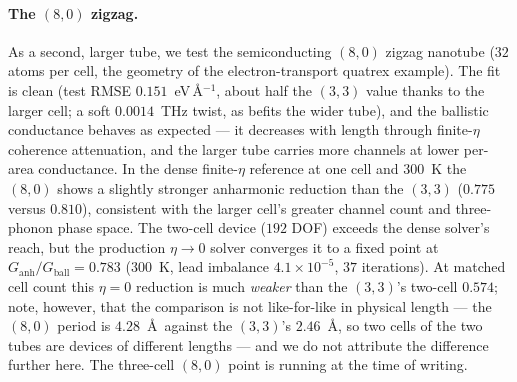 \paragraph{The $(8,0)$ zigzag.} As a second, larger tube, we test
the semiconducting $(8,0)$ zigzag nanotube ($32$ atoms per cell,
the geometry of the electron-transport quatrex example). The fit is clean (test
RMSE $0.151$~eV\,\AA$^{-1}$, about half the $(3,3)$ value thanks to the larger
cell; a soft $0.0014$~THz twist, as befits the wider tube), and the ballistic
conductance behaves as expected --- it decreases with length through finite-$\eta$
coherence attenuation, and the larger tube carries more channels at lower per-area
conductance. In the dense finite-$\eta$ reference at one cell and $300$~K the
$(8,0)$ shows a slightly stronger anharmonic reduction than the $(3,3)$
($0.775$ versus $0.810$), consistent with the larger cell's greater channel count
and three-phonon phase space. The two-cell device ($192$ DOF) exceeds the dense
solver's reach, but the production $\eta\to0$ solver converges it to a fixed
point at $G_\mathrm{anh}/G_\mathrm{ball}=0.783$ ($300$~K, lead imbalance
$4.1\times10^{-5}$, $37$ iterations). At matched cell count this $\eta=0$
reduction is much \emph{weaker} than the $(3,3)$'s two-cell $0.574$; note,
however, that the comparison is not like-for-like in physical length --- the
$(8,0)$ period is $4.28$~\AA\ against the $(3,3)$'s $2.46$~\AA, so two cells of
the two tubes are devices of different lengths --- and we do not attribute the
difference further here. The three-cell $(8,0)$ point is running at the time of
writing.

